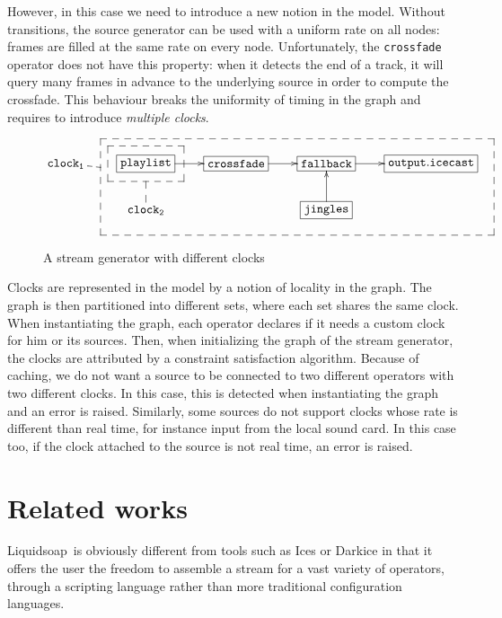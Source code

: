 \documentclass{llncs}
\newcommand{\liquidsoap}{Liquidsoap}
\begin{document}
However, in this case we need to introduce a new notion in the model. Without transitions, the 
source generator can be used with a uniform rate on all nodes: frames are filled
at the same rate on every node. Unfortunately, the \texttt{crossfade} operator
does not have this property: when it detects the end of a track, it will query many frames in advance 
to the underlying source in order to compute the crossfade. This behaviour breaks the uniformity of 
timing in the graph and requires to introduce \textit{multiple clocks}.


\begin{figure}[b]
 \begin{center}
\[
\def\f{\save
*+<15pt>[F--]\frm{}\ar @{--} "2,2"\restore}%
\def\g{\save
"2,4"."1,2"."1,5"!C*+<27pt>[F--]\frm{}\ar @{--} "1,1"\restore}%
\xymatrix{
   \mathtt{clock_1} & *+[F]{\mathtt{playlist}}\ar[r]\f&*+[F]{\mathtt{crossfade}}\ar[r]&  *+[F]{\mathtt{fallback}}\ar[r]&
  *+[F]{\mathtt{output.icecast}}\\
   &\mathtt{clock_2} &  & *+[F]{\mathtt{jingles}}\ar[u]\g& 
}
\]
\end{center}
 \caption{A stream generator with different clocks}
\end{figure}

Clocks are represented in the model by a notion of locality in the graph. The graph is then partitioned into 
different sets, where each set shares the same clock.
When instantiating the graph, each operator declares if it needs a custom clock for him or its sources. 
Then, when initializing the graph of the stream generator, the clocks are attributed by a constraint 
satisfaction algorithm. Because of caching, we do not want a source to be connected to two different operators with 
two different clocks. In this case, this is detected when instantiating the graph and an error is raised.
Similarly, some sources do not support clocks whose rate is different than real time, for instance input 
from the local sound card. In this case too, if the clock attached to the source is not real time, an error
is raised.

\section{Related works}

\liquidsoap\ is obviously different from tools such as Ices or Darkice in
that it offers the user the freedom to assemble a stream
for a vast variety of operators, through a scripting
language rather than more traditional configuration languages.
\end{document}
